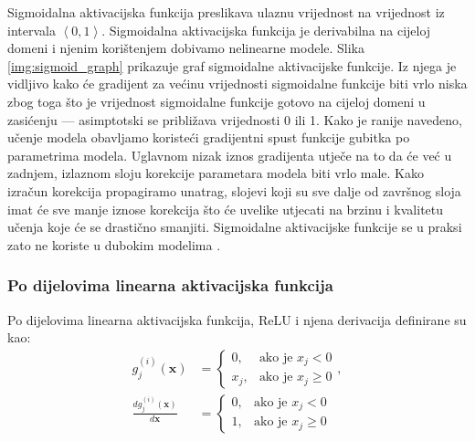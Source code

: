 \documentclass[times, utf8, diplomski, numeric]{fer}
\begin{document}
\noindent Sigmoidalna aktivacijska funkcija preslikava ulaznu vrijednost na vrijednost iz intervala $\left< 0, 1\right>$. Sigmoidalna aktivacijska funkcija je derivabilna na cijeloj domeni i njenim korištenjem dobivamo nelinearne modele. 
Slika \ref{img:sigmoid_graph} prikazuje graf sigmoidalne aktivacijske funkcije. 
Iz njega je vidljivo kako će gradijent za većinu vrijednosti sigmoidalne funkcije biti vrlo niska zbog toga što je vrijednost sigmoidalne funkcije gotovo na cijeloj domeni u zasićenju  — asimptotski se približava vrijednosti 0 ili 1.
Kako je ranije navedeno, učenje modela obavljamo koristeći gradijentni spust funkcije gubitka po parametrima modela. 
Uglavnom nizak iznos gradijenta utječe na to da će već u zadnjem, izlaznom sloju korekcije parametara modela biti vrlo male. 
Kako izračun korekcija propagiramo unatrag, slojevi koji su sve dalje od završnog sloja imat će sve manje iznose korekcija što će uvelike utjecati na brzinu i kvalitetu učenja koje će se drastično smanjiti.
Sigmoidalne aktivacijske funkcije se u praksi zato ne koriste u dubokim modelima \citep{seminar:rela}.

\subsubsection{Po dijelovima linearna aktivacijska funkcija}
Po dijelovima linearna aktivacijska funkcija, ReLU  i njena derivacija definirane su kao:
\begin{align}
 g^{(i)}_j(\mathbf{x})&=\left\{
 \begin{array}{ll}
 0,  & \mbox{ako je } x_j < 0 \\
 x_j, & \mbox{ako je } x_j \geq 0 
 \end{array}
 \right. , \\
 \frac{dg^{(i)}_j(\mathbf{x})}{d\mathbf{x}}&=\left\{
 \begin{array}{ll}
 0,  & \mbox{ako je } x_j < 0 \\
 1, & \mbox{ako je } x_j \geq 0 
 \end{array}
 \right.
\end{align}
\end{document}
